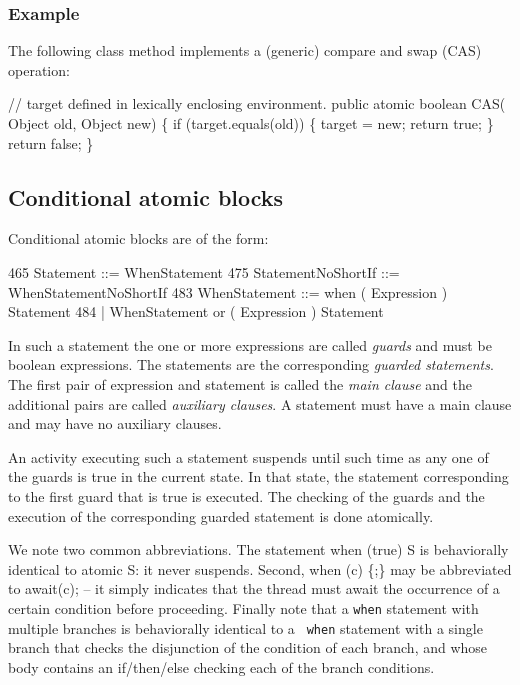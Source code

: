 \subsubsection{Example}

The following class method implements a (generic) compare and swap (CAS) operation:

\begin{x10}
// target defined in lexically enclosing environment.
public atomic boolean CAS( Object old, 
                           Object new) \{
   if (target.equals(old)) \{
     target = new;
     return true;
   \}
   return false;
\}
\end{x10}

\subsection{Conditional atomic blocks}

Conditional atomic blocks are of the form:
\begin{x10}
465 Statement ::= WhenStatement
475 StatementNoShortIf ::= WhenStatementNoShortIf
483 WhenStatement ::= 
          when ( Expression ) Statement
484     | WhenStatement 
          or ( Expression ) Statement
\end{x10}

In such a statement the one or more expressions are called {\em
guards} and must be {\cf boolean} expressions. The statements are the
corresponding {\em guarded statements}. The first pair of expression
and statement is called the {\em main clause} and the additional pairs
are called {\em auxiliary clauses}. A statement must have a main
clause and may have no auxiliary clauses.

An activity executing such a statement suspends until such time as any
one of the guards is true in the current state. In that state, the
statement corresponding to the first guard that is true is executed.
The checking of the guards and the execution of the corresponding
guarded statement is done atomically. 

We note two common abbreviations. The statement {\cf when (true) S} is
behaviorally identical to {\cf atomic S}: it never suspends. Second,
{\cf when (c) \{;\}} may be abbreviated to {\cf await(c);} -- it
simply indicates that the thread must await the occurrence of a
certain condition before proceeding.  Finally note that a {\tt when}
statement with multiple branches is behaviorally identical to a {\tt
when} statement with a single branch that checks the disjunction of
the condition of each branch, and whose body contains an {\cf
if/then/else} checking each of the branch conditions.

